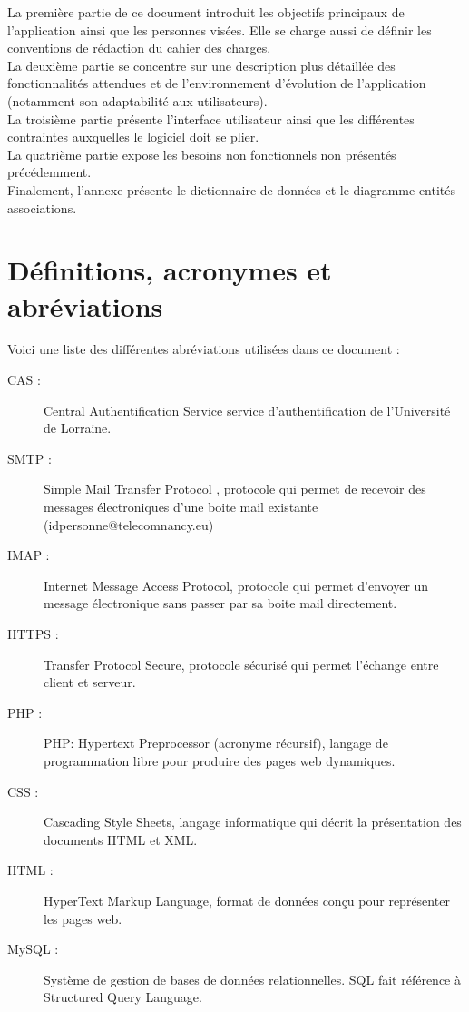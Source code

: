 \documentclass{scrreprt}
\begin{document}
\hspace{0.6cm}La première partie de ce document introduit les objectifs principaux de l’application ainsi que les personnes visées. Elle se charge aussi de définir les conventions de rédaction du cahier des charges.\\

\hspace{0.6cm}La deuxième partie se concentre sur une description plus détaillée des fonctionnalités attendues et de l'environnement d'évolution de l'application (notamment son adaptabilité aux utilisateurs).\\

\hspace{0.6cm}La troisième partie présente l'interface utilisateur ainsi que les différentes contraintes auxquelles le logiciel doit se plier.\\

\hspace{0.6cm}La quatrième partie expose les besoins non fonctionnels non présentés précédemment.\\

\hspace{0.6cm}Finalement, l'annexe présente le dictionnaire de données et le diagramme entités-associations.

\section{Définitions, acronymes et abréviations}
\hspace{1cm}Voici une liste des différentes abréviations utilisées dans ce document :
\begin{description}
\item[CAS :] Central Authentification Service service d'authentification de l'Université de Lorraine.
\item[SMTP :] Simple Mail Transfer Protocol , protocole qui permet de recevoir des messages électroniques d'une boite mail existante (idpersonne@telecomnancy.eu)
\item[IMAP :] Internet Message Access Protocol, protocole qui permet d'envoyer un message électronique sans passer par sa boite mail directement.
\item[HTTPS :] Transfer Protocol Secure, protocole sécurisé qui permet l'échange entre client et serveur.
\item[PHP :] PHP: Hypertext Preprocessor (acronyme récursif), langage de programmation libre pour produire des pages web dynamiques.
\item[CSS :] Cascading Style Sheets, langage informatique qui décrit la présentation des documents HTML et XML.
\item[HTML :] HyperText Markup Language, format de données conçu pour représenter les pages web.
\item[MySQL :] Système de gestion de bases de données relationnelles. SQL fait référence à Structured Query Language.

\end{description}
\end{document}
